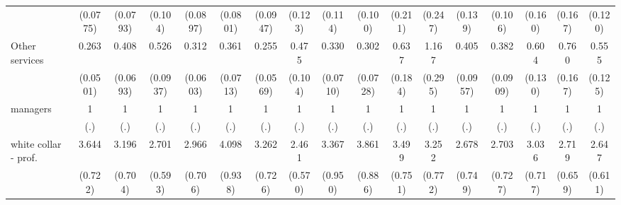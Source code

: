 {\begin{tabular}{l*{16}{c}}
                    &    (0.0775)         &    (0.0793)         &     (0.104)         &    (0.0897)         &    (0.0801)         &    (0.0947)         &     (0.123)         &     (0.114)         &     (0.100)         &     (0.211)         &     (0.247)         &     (0.139)         &     (0.106)         &     (0.160)         &     (0.167)         &     (0.120)         \\
[1em]
Other services      &       0.263\sym{***}&       0.408\sym{***}&       0.526\sym{***}&       0.312\sym{***}&       0.361\sym{***}&       0.255\sym{***}&       0.475\sym{***}&       0.330\sym{***}&       0.302\sym{***}&       0.637         &       1.167         &       0.405\sym{***}&       0.382\sym{***}&       0.604\sym{*}  &       0.760         &       0.555\sym{**} \\
                    &    (0.0501)         &    (0.0693)         &    (0.0937)         &    (0.0603)         &    (0.0713)         &    (0.0569)         &     (0.104)         &    (0.0710)         &    (0.0728)         &     (0.184)         &     (0.295)         &    (0.0957)         &    (0.0909)         &     (0.130)         &     (0.167)         &     (0.125)         \\
[1em]
managers            &           1         &           1         &           1         &           1         &           1         &           1         &           1         &           1         &           1         &           1         &           1         &           1         &           1         &           1         &           1         &           1         \\
                    &         (.)         &         (.)         &         (.)         &         (.)         &         (.)         &         (.)         &         (.)         &         (.)         &         (.)         &         (.)         &         (.)         &         (.)         &         (.)         &         (.)         &         (.)         &         (.)         \\
[1em]
white collar - prof.&       3.644\sym{***}&       3.196\sym{***}&       2.701\sym{***}&       2.966\sym{***}&       4.098\sym{***}&       3.262\sym{***}&       2.461\sym{***}&       3.367\sym{***}&       3.861\sym{***}&       3.499\sym{***}&       3.252\sym{***}&       2.678\sym{***}&       2.703\sym{***}&       3.036\sym{***}&       2.719\sym{***}&       2.647\sym{***}\\
                    &     (0.722)         &     (0.704)         &     (0.593)         &     (0.706)         &     (0.938)         &     (0.726)         &     (0.570)         &     (0.950)         &     (0.886)         &     (0.751)         &     (0.772)         &     (0.749)         &     (0.727)         &     (0.717)         &     (0.659)         &     (0.611)         \\

\end{tabular}}
